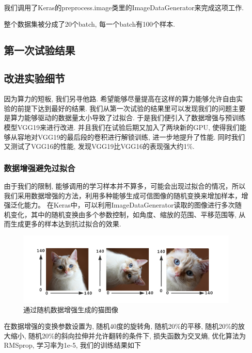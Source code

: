 \documentclass[lang=cn,11pt]{elegantpaper}
\begin{document}
我们调用了Keras的preprocess.image类里的ImageDataGenerator来完成这项工作.

整个数据集被分成了20个batch, 每一个batch有100个样本. 

\subsection{第一次试验结果}


\subsection{改进实验细节}

因为算力的短板, 我们另寻他路. 希望能够尽量提高在这样的算力能够允许自由实验的前提下达到最好的结果. 我们从第一次试验的结果里可以发现我们的问题主要是算力能够驱动的数据量太小导致了过拟合. 于是我们便引入了数据增强与预训练模型VGG19来进行改进. 并且我们在试验后期又加入了两块新的GPU, 使得我们能够从容地对VGG19的最后段的卷积进行解锁训练, 进一步地提升了性能. 同时我们又测试了VGG16的性能, 发现VGG19比VGG16的表现强大约1\%. 







\subsubsection{数据增强避免过拟合}
由于我们的限制, 能够调用的学习样本并不算多，可能会出现过拟合的情况，所以我们采用数据增强的方法，利用多种能够生成可信图像的随机变换来增加样本，增强泛化能力。 在Keras中，可以利用ImageDataGenerator读取的图像进行多次随机变化，其中的随机变换由多个参数控制，如角度、缩放的范围、平移范围等, 从而生成更多的样本达到抗过拟合的效果.

\begin{figure}[hbtp]
\centering
  \includegraphics{aug.png}
  \caption{通过随机数据增强生成的猫图像\label{fig:augcat}}
\end{figure}

在数据增强的变换参数设置为, 随机40度的旋转角, 随机20\%的平移, 随机20\%的放大缩小, 随机20\%的斜向拉伸并允许翻转的条件下, 损失函数为交叉熵, 优化算法为RMSprop, 学习率为1e-5, 我们的训练结果如下
\end{document}

